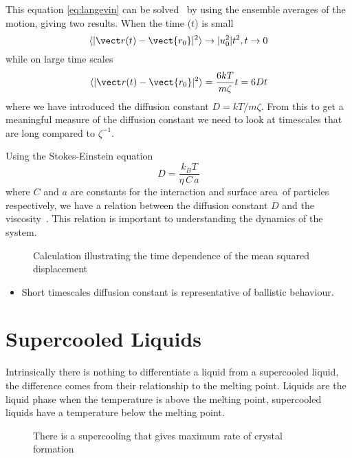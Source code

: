 This equation \eqref{eq:langevin} can be solved~\cite{mcquarrie:76} by using the ensemble averages of the motion, giving two results. When the time ($t$) is small
\begin{equation}
    \langle | \vect r(t) - \vect{r_0}|^2 \rangle \rightarrow |u_0^2|t^2,   t \rightarrow 0
\end{equation}
while on large time scales
\begin{equation}
    \langle | \vect r(t) - \vect{r_0} |^2 \rangle = \frac{6kT}{m\zeta} t = 6Dt
\end{equation}
where we have introduced the diffusion constant $D = kT/m\zeta$. From this to get a meaningful measure of the diffusion constant we need to look at timescales that are long compared to $\zeta^{-1}$.

Using the Stokes-Einstein equation
\begin{equation}
    D=\frac{k_B T}{\eta\,C\,a}
\end{equation}
where $C$ and $a$ are constants for the interaction and surface area~\tocheck of particles respectively, we have a relation between the diffusion constant $D$ and the viscosity~\tocite. This relation is important to understanding the dynamics of the system.

\begin{figure}
    \label{fig:MSD}
    \caption{Calculation illustrating the time dependence of the mean squared displacement}
\end{figure}

\begin{itemize}
    \item Short timescales diffusion constant is representative of ballistic behaviour.
\end{itemize}


\section{Supercooled Liquids}

Intrinsically there is nothing to differentiate a liquid from a supercooled liquid, the difference comes from their relationship to the melting point. Liquids are the liquid phase when the temperature is above the melting point, supercooled liquids have a temperature below the melting point.

\begin{figure}
    \caption{There is a supercooling that gives maximum rate of crystal formation}
    \label{fig:supercool crys}
\end{figure}


